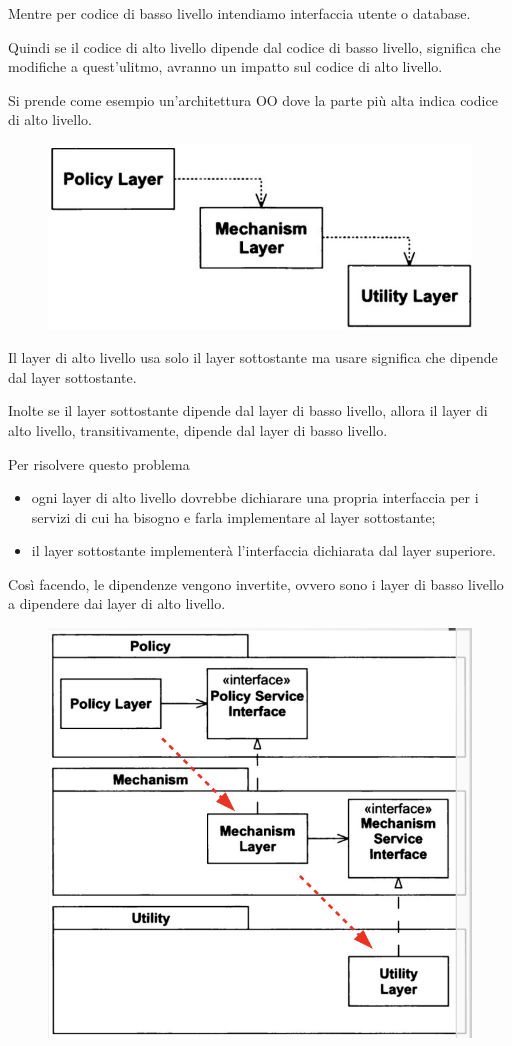 Mentre per codice di basso livello intendiamo interfaccia utente o database.

Quindi se il codice di alto livello dipende dal codice di basso livello, significa che modifiche a quest'ulitmo, avranno un impatto sul codice di alto livello.

Si prende come esempio un'architettura OO dove la parte più alta indica codice di alto livello.
\begin{figure}
  \includegraphics[width=0.5\linewidth]{../../immagini/principio_SOLID/architetturaOOnoDIP}  
\end{figure}

Il layer di alto livello usa solo il layer sottostante ma usare significa che dipende dal layer sottostante.

Inolte se il layer sottostante dipende dal layer di basso livello, allora il layer di alto livello, transitivamente, dipende dal layer di basso livello.

Per risolvere questo problema
\begin{itemize}
  \item ogni layer di alto livello dovrebbe dichiarare una propria interfaccia per i servizi di cui ha bisogno e farla implementare al layer sottostante;
  \item il layer sottostante implementerà l'interfaccia dichiarata dal layer superiore.
\end{itemize}

Così facendo, le dipendenze vengono invertite, ovvero sono i layer di basso livello a dipendere dai layer di alto livello.
\begin{figure}[H]
  \centering
  \includegraphics[width=0.5\linewidth]{../../immagini/principio_SOLID/architetturaOODIP}  
\end{figure}

